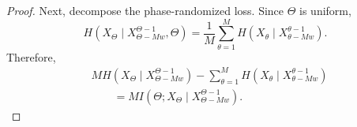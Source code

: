 \documentclass{article}
\theoremstyle{plain}
\theoremstyle{definition}
\theoremstyle{remark}
\begin{document}
\begin{proof}
    Next, decompose the phase-randomized loss. Since \(\Theta\) is uniform,
    \[
        H\!\left(
            X_{\Theta}
            \mid
            X_{\Theta-Mw}^{\Theta-1},
            \Theta
        \right)
        =
        \frac{1}{M}
        \sum_{\theta=1}^{M}
        H\!\left(
            X_{\theta}
            \mid
            X_{\theta-Mw}^{\theta-1}
        \right).
    \]
    Therefore,
    \begin{align}
    & M H\!\left(
            X_{\Theta}
            \mid
            X_{\Theta-Mw}^{\Theta-1}
        \right)
        -
        \sum_{\theta=1}^{M}
        H\!\left(
            X_{\theta}
            \mid
            X_{\theta-Mw}^{\theta-1}
        \right)
        \nonumber \\
    &\qquad =
        M I\!\left(
            \Theta;
            X_{\Theta}
            \mid
            X_{\Theta-Mw}^{\Theta-1}
        \right).
        \label{eq:phase-ambiguity-step}
    \end{align}
    

\end{proof}
\end{document}
